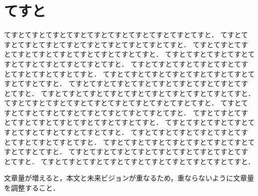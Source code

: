 \documentclass[twoside]{wiss}
\begin{document}




\section{てすと}

てすとてすとてすとてすとてすとてすとてすとてすとてすとてすと．
てすとてすとてすとてすとてすとてすとてすとてすとてすとてすと．
てすとてすとてすとてすとてすとてすとてすとてすとてすとてすと．
てすとてすとてすとてすとてすとてすとてすとてすとてすとてすと．
てすとてすとてすとてすとてすとてすとてすとてすとてすとてすと．
てすとてすとてすとてすとてすとてすとてすとてすとてすとてすと．
てすとてすとてすとてすとてすとてすとてすとてすとてすとてすと．
てすとてすとてすとてすとてすとてすとてすとてすとてすとてすと．
てすとてすとてすとてすとてすとてすとてすとてすとてすとてすと．
てすとてすとてすとてすとてすとてすとてすとてすとてすとてすと．
てすとてすとてすとてすとてすとてすとてすとてすとてすとてすと．
てすとてすとてすとてすとてすとてすとてすとてすとてすとてすと．
てすとてすとてすとてすとてすとてすとてすとてすとてすとてすと．
てすとてすとてすとてすとてすとてすとてすとてすとてすとてすと．
てすとてすとてすとてすとてすとてすとてすとてすとてすとてすと．
てすとてすとてすとてすとてすとてすとてすとてすとてすとてすと．


文章量が増えると，本文と未来ビジョンが重なるため，重ならないように文章量を調整すること．






\end{document}
